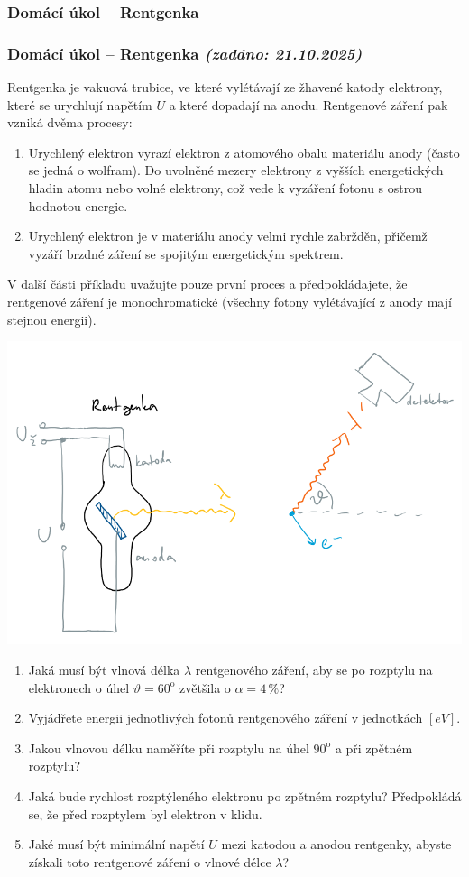 \documentclass[a4paper,11pt,twoside]{article}
\newenvironment{homework}{}{}
\newcommand{\np}{\clearpage\newpage}
\newcommand{\exercise}[2][]{\ifthenelse{\isempty{#1}}
	{\np\thispagestyle{empty}\subsubsection*{Domácí úkol -- #2}}
	{\np\thispagestyle{empty}\np\subsubsection*{Domácí úkol -- #2 \small{\it{(zadáno: {#1})}}}}
}
\begin{document}
\begin{homework}
	\exercise[21.10.2025]{Rentgenka}
    Rentgenka je vakuová trubice, ve které vylétávají ze žhavené katody elektrony, které se urychlují napětím $U$ a které dopadají na anodu.
    Rentgenové záření pak vzniká dvěma procesy:
    \begin{enumerate}
        \item Urychlený elektron vyrazí elektron z atomového obalu materiálu anody (často se jedná o wolfram).
            Do uvolněné mezery  elektrony z vyšších energetických hladin atomu nebo volné elektrony, což vede k vyzáření fotonu s ostrou hodnotou energie.
        \item Urychlený elektron je v materiálu anody velmi rychle zabržděn, přičemž vyzáří brzdné záření se spojitým energetickým spektrem.
    \end{enumerate}
    V další části příkladu uvažujte pouze první proces a předpokládajete, že rentgenové záření je monochromatické (všechny fotony vylétávající z anody mají stejnou energii).

    \begin{center}
        \includegraphics[width=0.8\linewidth]{Rentgenka.png}
    \end{center}
    \begin{enumerate}
    \item 
        Jaká musí být vlnová délka $\lambda$ rentgenového záření, aby se po rozptylu na elektronech o úhel $\vartheta=60^{\mathrm{o}}$ zvětšila o $\alpha=4\,\%$?
    \item 
        Vyjádřete energii jednotlivých fotonů rentgenového záření v jednotkách $[\unit{eV}]$.
    \item 
        Jakou vlnovou délku naměříte při rozptylu na úhel $90^{\mathrm{o}}$ a při zpětném rozptylu?
	\item
		Jaká bude rychlost rozptýleného elektronu po zpětném rozptylu? Předpokládá se, že před rozptylem byl elektron v klidu.
    \item 
        Jaké musí být minimální napětí $U$ mezi katodou a anodou rentgenky, abyste získali toto rentgenové záření o vlnové délce $\lambda$?
    \end{enumerate}	
\end{homework}
\end{document}
